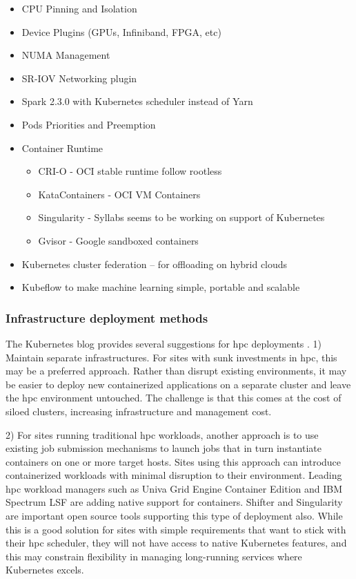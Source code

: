 \documentclass[12pt]{article}
\begin{document}
\begin{itemize}
    \item CPU Pinning and Isolation
    \item Device Plugins (GPUs, Infiniband, FPGA, etc)
    \item NUMA Management
    \item SR-IOV Networking plugin
    \item Spark 2.3.0 with Kubernetes scheduler instead of Yarn
    \item Pods Priorities and Preemption
    \item Container Runtime
        \begin{itemize}
        \item CRI-O - OCI stable runtime follow rootless
        \item KataContainers - OCI VM Containers
        \item Singularity - Syllabs seems to be working on support of Kubernetes
        \item Gvisor - Google sandboxed containers
    \end{itemize}
    \item Kubernetes cluster federation – for offloading on hybrid clouds
    \item Kubeflow to make machine learning simple, portable and scalable
\end{itemize}

\subsubsection{Infrastructure deployment methods}
The Kubernetes blog provides several suggestions for \gls{hpc} deployments \cite{kubenetes-blog-meets-hpc}. 1) Maintain separate infrastructures. For sites with sunk investments in \gls{hpc}, this may be a preferred approach. Rather than disrupt existing environments, it may be easier to deploy new containerized applications on a separate cluster and leave the \gls{hpc} environment untouched. The challenge is that this comes at the cost of siloed clusters, increasing infrastructure and management cost.

2) For sites running traditional \gls{hpc} workloads, another approach is to use existing job submission mechanisms to launch jobs that in turn instantiate containers on one or more target hosts. Sites using this approach can introduce containerized workloads with minimal disruption to their environment. Leading \gls{hpc} workload managers such as Univa Grid Engine Container Edition and IBM Spectrum LSF are adding native support for containers. Shifter and Singularity are important open source tools supporting this type of deployment also. While this is a good solution for sites with simple requirements that want to stick with their \gls{hpc} scheduler, they will not have access to native Kubernetes features, and this may constrain flexibility in managing long-running services where Kubernetes excels.
\end{document}
